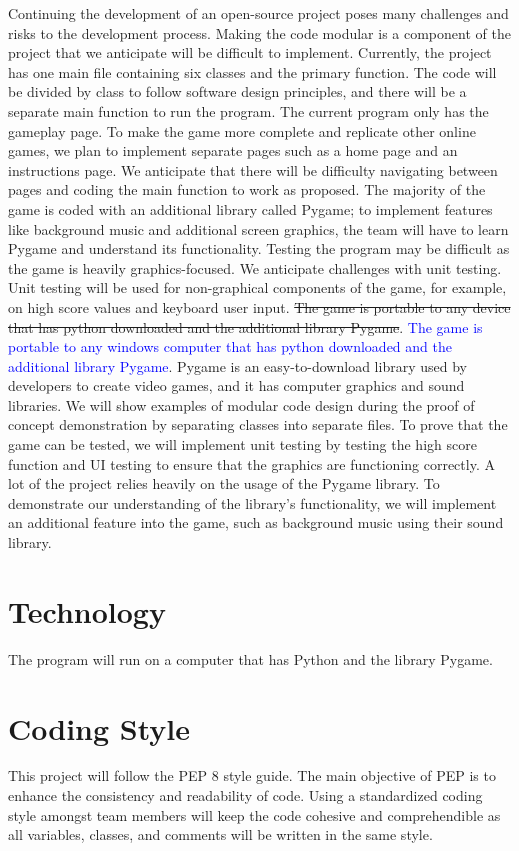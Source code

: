 \documentclass{article}
\begin{document}
	Continuing the development of an open-source project poses many challenges and risks to the development process. Making the code modular is a component of the project that we anticipate will be difficult to implement. 
	Currently, the project has one main file containing six classes and the primary function. The code will be divided by class to follow software design principles, and there will be a separate main function to run the program.
	 The current program only has the gameplay page. To make the game more complete and replicate other online games, we plan to implement separate pages such as a home page and an instructions page. We anticipate that there will be difficulty navigating between pages and coding the main function to work as proposed. 
	 The majority of the game is coded with an additional library called Pygame; to implement features like background music and additional screen graphics, the team will have to learn Pygame and understand its functionality. 
	Testing the program may be difficult as the game is heavily graphics-focused. We anticipate challenges with unit testing. Unit testing will be used for non-graphical components of the game, for example, on high score values and keyboard user input.
	 \sout{The game is portable to any device that has python downloaded and the additional library Pygame}.
	  \textcolor{blue}{The game is portable to any windows computer that has python downloaded and the additional library Pygame}. Pygame is an easy-to-download library used by developers to create video games, and it has computer graphics and sound libraries. 
We will show examples of modular code design during the proof of concept demonstration by separating classes into separate files. To prove that the game can be tested, we will implement unit testing by testing the high score function and UI testing to ensure that the graphics are functioning correctly. A lot of the project relies heavily on the usage of the Pygame library. 
To demonstrate our understanding of the library's functionality, we will implement an additional feature into the game, such as background music using their sound library. 

	
	\section{Technology}
	The program will run on a computer that has Python and the library Pygame. 
	
	\section{Coding Style}
	This project will follow the PEP 8 style guide. The main objective of PEP is to enhance the consistency and readability of code. Using a standardized coding style amongst team members will keep the code cohesive and comprehendible as all variables, classes, and comments will be written in the same style. 
	
\end{document}
